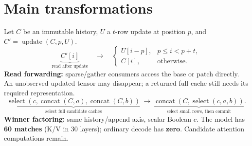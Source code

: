 \documentclass[10pt,a4paper]{article}
\newcommand{\sel}{\operatorname{select}}
\newcommand{\cat}{\operatorname{concat}}
\newcommand{\up}{\operatorname{update}}
\begin{document}
\section{Main transformations}
Let $C$ be an immutable history, $U$ a $t$-row update at position $p$, and $C'=\up(C,p,U)$.
\begin{equation*}
\underbrace{C'[i]}_{\text{read after update}}\quad\longrightarrow\quad
\begin{cases}U[i-p],&p\leq i<p+t,\\C[i],&\text{otherwise.}\end{cases}
\end{equation*}
\textbf{Read forwarding:} sparse/gather consumers access the base or patch directly. An unobserved updated tensor may disappear; a returned full cache still needs its required representation.
\begin{equation*}
\underbrace{\sel(c,\cat(C,a),\cat(C,b))}_{\text{select full candidate caches}}
\ \longrightarrow\ \underbrace{\cat(C,\sel(c,a,b))}_{\text{select small rows, then commit}}.
\end{equation*}
\textbf{Winner factoring:} same history/append axis, scalar Boolean $c$. The model has \textbf{60 matches} (K/V in 30 layers); ordinary decode has \textbf{zero}. Candidate attention computations remain.
\end{document}

